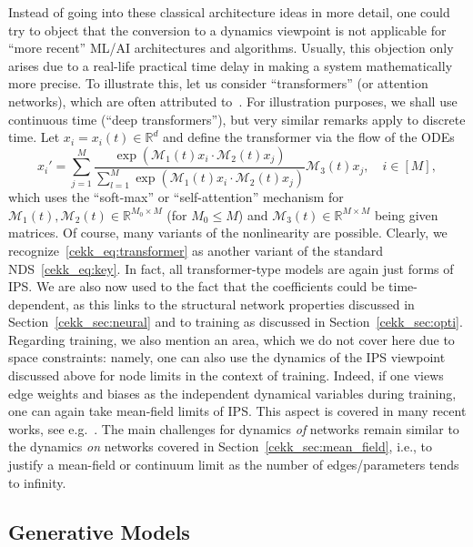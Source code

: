 \documentclass[10pt]{article}
\newcommand{\R}{{\mathbb R}}
\def\R{\mathbb{R}}
\def\cM{\mathcal{M}}
\newcommand{\be}{\begin{equation}}
\newcommand{\ee}{\end{equation}}
\begin{document}
Instead of going into these classical architecture ideas in more detail, one could try to object that the conversion to a dynamics viewpoint is not applicable for ``more recent'' ML/AI architectures and algorithms. Usually, this objection only arises due to a real-life practical time delay in making a system mathematically more precise. To illustrate this, let us consider ``transformers'' (or attention networks), which are often attributed to~\cite{Vaswanietal}. For illustration purposes, we shall use continuous time (``deep transformers''), but very similar remarks apply to discrete time. Let $x_i=x_i(t)\in\R^d$ and define the transformer via the flow of the ODEs
\be
\label{cekk_eq:transformer}
x_i'=\sum_{j=1}^M \frac{\exp(\cM_1(t)x_i\cdot \cM_2(t)x_j)}{\sum_{l=1}^M \exp(\cM_1(t)x_i\cdot \cM_2(t)x_j)}\cM_3(t)x_j,\quad i \in[M],
\ee  
which uses the ``soft-max'' or ``self-attention'' mechanism for $\cM_{1}(t),\cM_{2}(t)\in\R^{M_0\times M}$ (for $M_0\leq M$) and $\cM_{3}(t)\in\R^{M\times M}$ being given matrices. Of course, many variants of the nonlinearity are possible. Clearly, we  recognize~\eqref{cekk_eq:transformer} as another variant of the standard NDS~\eqref{cekk_eq:key}. In fact, all transformer-type models are again just forms of IPS. We are also now used to the fact that the coefficients could be time-dependent, as this links to the structural network properties discussed in Section~\ref{cekk_sec:neural} and to training as discussed in Section~\ref{cekk_sec:opti}. 
Regarding training, we also mention an area, which we do not cover here due to space constraints: namely, one can also use the dynamics of the IPS viewpoint discussed above for node limits in the context of training. Indeed, if one views edge weights and biases as the independent dynamical variables during training, one can again take mean-field limits of IPS. This aspect is covered in many recent works, see e.g.~\cite{Fornasieretal,RotskoffVandenEijnden,Sirignano20}. The main challenges for dynamics \emph{of} networks remain similar to the dynamics \emph{on} networks covered in Section~\ref{cekk_sec:mean_field}, i.e., to justify a mean-field or continuum limit as the number of edges/parameters tends to infinity.

\subsection{Generative Models}
\label{cekk_sec:gen_models}
\end{document}
